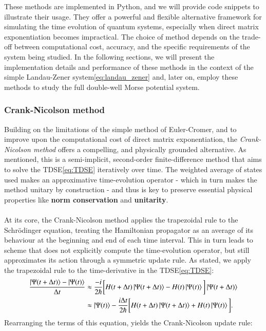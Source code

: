 \documentclass{subfiles}
\begin{document}
These methods are implemented in Python, and we will provide code snippets to illustrate their usage. They offer a powerful and flexible alternative framework for simulating the time evolution of quantum systems, especially when direct matrix exponentiation becomes impractical. The choice of method depends on the trade-off between computational cost, accuracy, and the specific requirements of the system being studied. In the following sections, we will present the implementation details and performance of these methods in the context of the simple Landau-Zener system\eqref{eq:landau_zener} and, later on, employ these methods to study the full double-well Morse potential system.

\subsubsection{Crank-Nicolson method} 
Building on the limitations of the simple method of Euler-Cromer, and to improve upon the computational cost of direct matrix exponentiation, the \emph{Crank-Nicolson method} offers a compelling, and physically grounded alternative. As mentioned, this is a semi-implicit, second-order finite-difference method that aims to solve the TDSE\eqref{eq:TDSE} iteratively over time. The weighted average of states used makes an approximative time-evolution operator - which in turn makes the method unitary by construction - and thus is key to preserve essential physical properties like \textbf{norm conservation} and \textbf{unitarity}. \\\\
At its core, the Crank-Nicolson method applies the trapezoidal rule to the Schrödinger equation, treating the Hamiltonian propagator as an average of its behaviour at the beginning and end of each time interval. This in turn leads to scheme that does not explicitly compute the time-evolution operator, but still approximates its action through a symmetric update rule. As stated, we apply the trapezoidal rule to the time-derivative in the TDSE\eqref{eq:TDSE}:
\begin{align*}
    \frac{\ket{\Psi(t + \Delta t)} - \ket{\Psi(t)}}{\Delta t} &\approx \frac{-i}{2\hbar}\bigg[H(t + \Delta t)\ket{\Psi(t + \Delta t)} - H(t)\ket{\Psi(t)}\bigg]
    \ket{\Psi(t + \Delta t)} \\
    &\approx \ket{\Psi(t)} - \frac{i\Delta t}{2\hbar}\bigg[H(t + \Delta t)\ket{\Psi(t + \Delta t)} + H(t)\ket{\Psi(t)}\bigg].
\end{align*}
Rearranging the terms of this equation, yields the Crank-Nicolson update rule:
\end{document}
